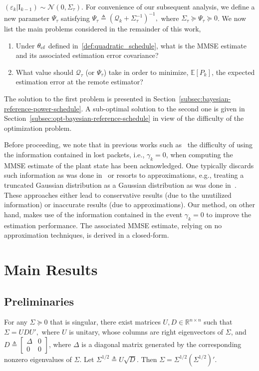 \documentclass[twocolumn]{autart}    \usepackage{cite}
\begin{document}
{{$(\varepsilon_k|\mathrm{I}_{k-1})\sim
\mathcal{N}(0,\Sigma_{\tau}).$
For convenience of our subsequent analysis, we define a new parameter $\Psi_\tau$ satisfying
$\Psi_\tau\triangleq \left(\mathcal{Q}_k+\Sigma_\tau^{-1}\right)^{-1},$
where $\Sigma_\tau\succeq\Psi_\tau\succeq0$.
We now list the main
problems considered in the remainder of this work,
\begin{enumerate}
\item Under $\theta_{\rm ef}$ defined in~\eqref{def:quadratic_schedule}, what is the
    MMSE estimate and its associated
    estimation error covariance?
\item What value should $\mathcal{Q}_\tau$ (or $\Psi_\tau$) take in order
to minimize, $\mathbb{E}[P_k]$, the expected estimation error at the remote estimator?
\end{enumerate}
The solution to the first problem is presented in
Section~\ref{subsec:bayesian-reference-power-schedule}.
A sub-optimal solution to the second one is given
in Section~\ref{subsec:opt-bayesian-reference-schedule} in
view of the difficulty of the optimization problem.


{Before proceeding, we note that in previous works such as~\cite{GatsisACC13}
the difficulty of
using the information contained in lost packets, i.e., $\gamma_k = 0$, when computing
the MMSE estimate of the plant state has been acknowledged. One typically discards such information as was done in~\cite{GatsisACC13} or resorts to approximations, e.g., treating a truncated Gaussian distribution as a Gaussian distribution as was done in~\cite{wu2013event}. These approaches either lead to conservative results (due to the unutilized information) or inaccurate results (due to approximations).
Our method, on other hand, makes use of the information contained in the event $\gamma_k=0$ to improve the estimation performance. The associated MMSE estimate, relying on no approximation techniques, is derived in a closed-form.}

\section{Main Results} \label{section:analysis}


\subsection{Preliminaries}\label{subsec:preliminaries}


For any $\Sigma\succeq 0$ that is singular,
there exist
matrices $U,D\in\mathbb{R}^{n\times n}$
such that
$
\Sigma=UDU',
$
where $U$ is unitary, whose columns
are right eigenvectors of $\Sigma$,
and $D\triangleq\left[
\begin{array}{cc}
\Delta  & 0\\
0 & 0
\end{array}\right]$, where $\Delta$
is a diagonal matrix generated by the
corresponding nonzero eigenvalues
of $\Sigma$. Let $\Sigma^{1/2}\triangleq
U\sqrt{D}$. Then $\Sigma=\Sigma^{1/2}
\left(\Sigma^{1/2}\right)'.$

}}
\end{document}
